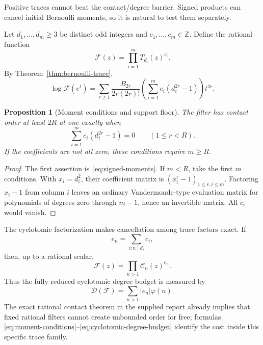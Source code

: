 \documentclass[11pt,oneside]{article}
\newtheorem{proposition}[theorem]{Proposition}
\theoremstyle{definition}
\theoremstyle{remark}
\newcommand{\Z}{\mathbb Z}
\begin{document}
Positive traces cannot beat the contact/degree barrier.  Signed products can cancel initial
Bernoulli moments, so it is natural to test them separately.

Let \(d_1,\ldots,d_m\ge3\) be distinct odd integers and
\(c_1,\ldots,c_m\in\Z\).  Define the rational function
\begin{equation}
 \mathcal F(z)=\prod_{i=1}^{m}T_{d_i}(z)^{c_i}.
 \label{eq:signed-filter}
\end{equation}
By Theorem~\ref{thm:bernoulli-trace},
\begin{equation}
 \log\mathcal F(e^t)=
 \sum_{r\ge1}\frac{B_{2r}}{2r(2r)!}
 \left(\sum_{i=1}^{m}c_i(d_i^{2r}-1)\right)t^{2r}.
 \label{eq:signed-moments}
\end{equation}

\begin{proposition}[Moment conditions and support floor]
\label{prop:signed-support}
The filter has contact order at least \(2R\) at one exactly when
\begin{equation}
 \sum_{i=1}^{m}c_i(d_i^{2r}-1)=0
 \qquad(1\le r<R).
 \label{eq:moment-conditions}
\end{equation}
If the coefficients are not all zero, these conditions require \(m\ge R\).
\end{proposition}

\begin{proof}
The first assertion is~\eqref{eq:signed-moments}.  If \(m<R\), take the first \(m\)
conditions.  With \(x_i=d_i^2\), their coefficient matrix is
\((x_i^r-1)_{1\le r,i\le m}\).  Factoring \(x_i-1\) from column \(i\) leaves an ordinary
Vandermonde-type evaluation matrix for polynomials of degrees zero through \(m-1\), hence an
invertible matrix.  All \(c_i\) would vanish.
\end{proof}

The cyclotomic factorization makes cancellation among trace factors exact.  If
\begin{equation}
 e_n=\sum_{i:n\mid d_i}c_i,
 \label{eq:cyclotomic-exponents}
\end{equation}
then, up to a rational scalar,
\begin{equation}
 \mathcal F(z)=\prod_{n>1}\mathscr C_n(z)^{e_n}.
 \label{eq:signed-cyclotomic}
\end{equation}
Thus the fully reduced cyclotomic degree budget is measured by
\begin{equation}
 \mathcal D(\mathcal F)=\sum_{n>1}|e_n|\varphi(n).
 \label{eq:cyclotomic-degree-budget}
\end{equation}
The exact rational contact theorem in the supplied report already implies that fixed rational
filters cannot create unbounded order for free; formulas
\eqref{eq:moment-conditions}--\eqref{eq:cyclotomic-degree-budget} identify the cost inside this
specific trace family.
\end{document}
